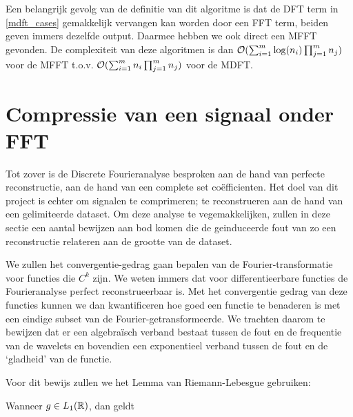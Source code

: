 Een belangrijk gevolg van de definitie van dit algoritme is dat de DFT term in \ref{mdft_cases}
gemakkelijk vervangen kan worden door een FFT term, beiden geven immers dezelfde output. 
Daarmee hebben we ook direct een MFFT gevonden.
De complexiteit van deze algoritmen is dan $\mathcal{O}( \sum_{i=1}^m \log(n_i) \prod_{j=1}^m n_j)$  voor de MFFT
t.o.v. $\mathcal{O}( \sum_{i=1}^m n_i \prod_{j=1}^m n_j)$ voor de MDFT.

\section{Compressie van een signaal onder FFT}
\label{daling_FFT}
Tot zover is de Discrete Fourieranalyse besproken aan de hand van perfecte reconstructie, 
aan de hand van een  complete set co\"efficienten. Het doel van dit project is echter om
signalen te comprimeren; te reconstrueren aan de hand van een gelimiteerde dataset.
Om deze analyse te vegemakkelijken, zullen in deze sectie een aantal bewijzen aan bod komen die
de geinduceerde fout van zo een reconstructie relateren aan de grootte van de dataset.

We zullen het convergentie-gedrag gaan bepalen van de Fourier-transformatie voor functies die $C^k$ zijn.
We weten immers dat voor differentieerbare functies de Fourieranalyse perfect reconstrueerbaar is.
Met het convergentie gedrag van deze functies kunnen we dan kwantificeren hoe goed een functie te 
benaderen is met een eindige subset van de Fourier-getransformeerde.
We trachten daarom te bewijzen dat er een algebra\"isch verband bestaat tussen de fout en de frequentie
van de wavelets en bovendien een exponentieel verband tussen de fout en de `gladheid' van de functie.

Voor dit bewijs zullen we het Lemma van Riemann-Lebesgue gebruiken: 
\begin{lemm}
Wanneer $g \in L_1(\mathbb{R})$, dan geldt 
\end{lemm}

